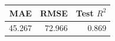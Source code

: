 \begin{tabular}{rrr}
\toprule
MAE & RMSE & Test $R^2$ \\
\midrule
45.267 & 72.966 & 0.869 \\
\bottomrule
\end{tabular}
